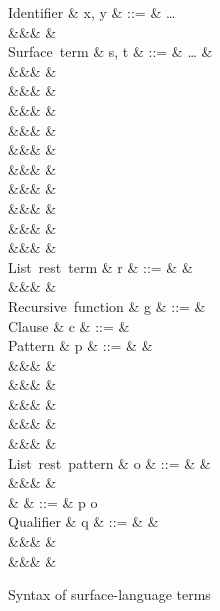 \begin{figure}[H]
\begin{syntaxfig}
\mbox{Identifier}
&
x, y
&
::=
&
\ldots
\\
&&&
\primOp
&
\\
\mbox{Surface term}
&
s, t
&
::=
&
\ldots
&
\\
&&&
\exOp{\primOp}
&
\\
&&&
&
\\
&&&
&
\\
&&&
&
\\
&&&
&
\\
&&&
&
\\
&&&
&
\\
&&&
&
\\
&&&
&
\\
&&&
&
\\[2mm]

\mbox{List rest term}
&
r
&
::=
&
\annListEnd{\alpha}
&
\\
&&&
&
\\[2mm]

\mbox{Recursive function}
&
g
&
::=
&
\\[2mm]

\mbox{Clause}
&
c
&
::=
&
\\[2mm]

\mbox{Pattern}
&
p
&
::=
&
&
\\
&&&
&
\\
&&&
\pattNil
&
\\
&&&
&
\\
&&&
&
\\
&&&
&
\\[2mm]

\mbox{List rest pattern}
&
o
&
::=
&
\pattListEnd
&
\\
&&&
&
\\[2mm]

&
\pi
&
::=
&
p \mid o
\\[2mm]

\mbox{Qualifier}
&
q
&
::=
&
&
\\
&&&
&
\\
&&&
&
\end{syntaxfig}
\caption{Syntax of surface-language terms}
\end{figure}

